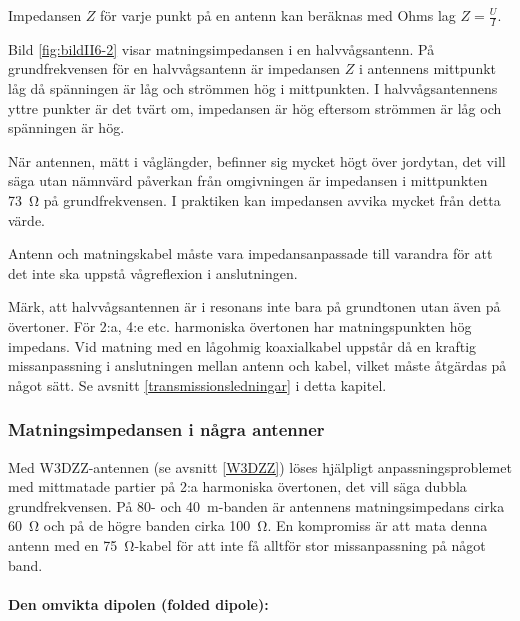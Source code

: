 
Impedansen \(Z\) för varje punkt på en antenn kan beräknas med Ohms lag
\(Z = \frac{U}{I}\).

Bild \ref{fig:bildII6-2} visar matningsimpedansen i en halvvågsantenn.
På grundfrekvensen för en halvvågsantenn är impedansen \(Z\) i antennens
mittpunkt låg då spänningen är låg och strömmen hög i mittpunkten.
I halvvågsantennens yttre punkter är det tvärt om, impedansen är hög eftersom
strömmen är låg och spänningen är hög.

När antennen, mätt i våglängder, befinner sig mycket högt över jordytan, det
vill säga utan nämnvärd påverkan från omgivningen är impedansen i mittpunkten
\SI{73}{\ohm} på grundfrekvensen.
I praktiken kan impedansen avvika mycket från detta värde.

Antenn och matningskabel måste vara impedansanpassade till varandra
för att det inte ska uppstå vågreflexion i anslutningen.

Märk, att halvvågsantennen är i resonans inte bara på grundtonen utan även på
övertoner.
För 2:a, 4:e etc. harmoniska övertonen har matningspunkten hög impedans.
Vid matning med en lågohmig koaxialkabel uppstår då en kraftig missanpassning i
anslutningen mellan antenn och kabel, vilket måste åtgärdas på något sätt.
Se avsnitt \ref{transmissionsledningar} i detta kapitel.

\subsubsection{Matningsimpedansen i några antenner}

Med W3DZZ-antennen (se avsnitt \ref{W3DZZ}) löses hjälpligt anpassningsproblemet
med mittmatade partier på 2:a harmoniska övertonen, det vill säga dubbla
grundfrekvensen.
På 80- och \SI{40}{\metre}-banden är antennens matningsimpedans cirka
\SI{60}{\ohm} och på de högre banden cirka \SI{100}{\ohm}.
En kompromiss är att mata denna antenn med en \SI{75}{\ohm}-kabel för att inte
få alltför stor missanpassning på något band.

\paragraph{Den omvikta dipolen (folded dipole):}

